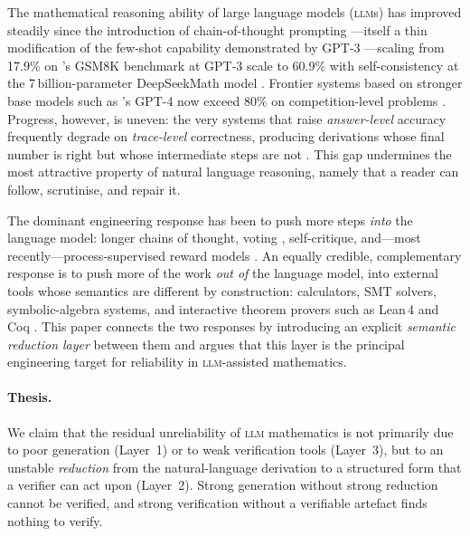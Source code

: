 \documentclass[11pt,a4paper]{article}
\newcommand{\LLM}{\textsc{llm}}
\newcommand{\Coq}{Coq}
\newcommand{\LeanFour}{Lean\,4}
\begin{document}
The mathematical reasoning ability of large language models
(\LLM{}s) has improved steadily since the introduction of
chain-of-thought prompting
\citep{wei2022cot}---itself a thin modification of the few-shot
capability demonstrated by GPT-3 \citep{brown2020gpt3}---scaling
from 17.9\% on \citet{cobbe2021gsm8k}'s GSM8K benchmark at GPT-3
scale to $60.9\%$ with self-consistency at the 7\,billion-parameter
DeepSeekMath model \citep{shao2024deepseekmath}.  Frontier systems
based on stronger base models such as \citet{openai2023gpt4tr}'s
GPT-4 now exceed $80\%$ on competition-level problems
\citep{bubeck2023sparks}.
Progress, however, is uneven: the very systems that raise
\emph{answer-level} accuracy frequently degrade on \emph{trace-level}
correctness, producing derivations whose final number is right but
whose intermediate steps are not \citep{lightman2023letsverify}.
This gap undermines the most attractive property of natural language
reasoning, namely that a reader can follow, scrutinise, and repair
it.

The dominant engineering response has been to push more steps
\emph{into} the language model: longer chains of thought, voting
\citep{wang2023selfconsistency}, self-critique, and---most
recently---process-supervised reward models
\citep{lightman2023letsverify}.  An equally credible, complementary
response is to push more of the work \emph{out of} the language
model, into external tools whose semantics are different by
construction: calculators, SMT solvers, symbolic-algebra systems,
and interactive theorem provers such as \LeanFour{} and \Coq{}
\citep{yang2023leandojo,wu2022autoformalization}.
This paper connects the two responses by introducing an explicit
\emph{semantic reduction layer} between them and argues that this
layer is the principal engineering target for reliability in
\LLM{}-assisted mathematics.

\paragraph{Thesis.} We claim that the residual unreliability of
\LLM{} mathematics is not primarily due to poor generation (Layer~1)
or to weak verification tools (Layer~3), but to an unstable
\emph{reduction} from the natural-language derivation to a
structured form that a verifier can act upon (Layer~2).  Strong
generation without strong reduction cannot be verified, and strong
verification without a verifiable artefact finds nothing to verify.
\end{document}
